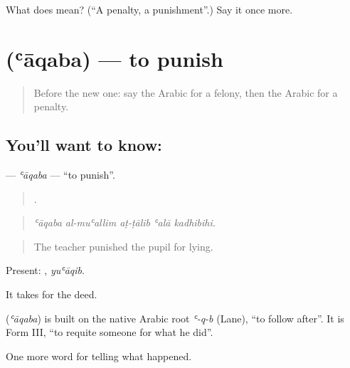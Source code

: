 \begin{tcolorbox}[breakable,colback=teal!4,colframe=teal!35!black,title={Before you move on}]
What does  mean? (\textquotedblleft{}A penalty, a punishment\textquotedblright{}.) Say it once more.
\end{tcolorbox}
\section[\texorpdfstring{\ar{عاقب} (ʿāqaba)}{عاقب (ʿāqaba)}]{ (ʿāqaba) — to punish}

\label{lesson:AR-C348-aqaba}



\begin{quote}
Before the new one: say the Arabic for a felony, then the Arabic for a penalty.
\end{quote}

\subsection*{You'll want to know: }
\textbf{} — \emph{ʿāqaba} — \textquotedblleft{}to punish\textquotedblright{}.

\begin{quote}
    .
\end{quote}

\begin{quote}
\emph{ʿāqaba al-muʿallim aṭ-ṭālib ʿalā kadhibihi.}
\end{quote}

\begin{quote}
The teacher punished the pupil for lying.
\end{quote}

Present: , \emph{yuʿāqib}.

It takes  for the deed.

\begin{cousinweb}
\textbf{} (\emph{ʿāqaba}) is built on the native Arabic root \emph{ʿ-q-b} (Lane), \textquotedblleft{}to follow after\textquotedblright{}. It is Form III, \textquotedblleft{}to requite someone for what he did\textquotedblright{}.
\end{cousinweb}

\begin{grammarlens}[title={What you've built}]
One more word for telling what happened.
\end{grammarlens}

